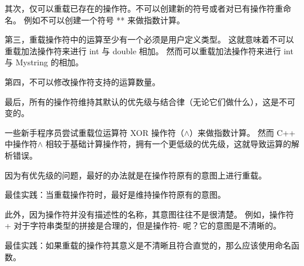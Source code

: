 \documentclass[../../LearnCpp.tex]{subfiles}
\begin{document}
其次，仅可以重载已存在的操作符。不可以创建新的符号或者对已有操作符重命名。
例如不可以创建一个符号 ** 来做指数计算。

第三，重载操作符中的运算至少有一个必须是用户定义类型。
这就意味着不可以重载加法操作符来进行 int 与 double 相加。
然而可以重载加法操作符来进行 int 与 Mystring 的相加。

第四，不可以修改操作符支持的运算数量。

最后，所有的操作符维持其默认的优先级与结合律（无论它们做什么），这是不可变的。

一些新手程序员尝试重载位运算符 XOR 操作符（$\wedge$）来做指数计算。
然而 C++ 中操作符$\wedge$ 相较于基础计算操作符，拥有一个更低级的优先级，这就导致运算的解析错误。

因为有优先级的问题，最好的办法就是在操作符原有的意图上进行重载。

最佳实践：当重载操作符时，最好是维持操作符原有的意图。

此外，因为操作符并没有描述性的名称，其意图往往不是很清楚。
例如，操作符+ 对于字符串类型的拼接是合理的，但是操作符- 呢？它的意图是不清晰的。

最佳实践：如果重载的操作符其意义是不清晰且符合直觉的，那么应该使用命名函数。
\end{document}
